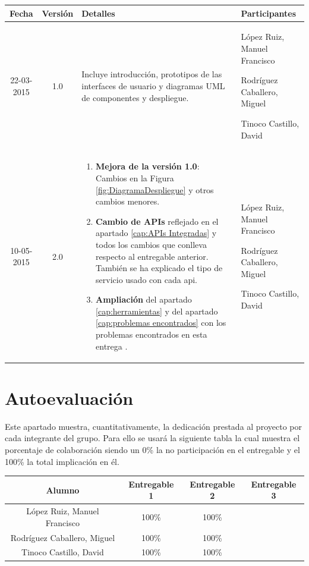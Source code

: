 \documentclass{scrartcl}
\begin{document}
\begin{tabularx}{14.9cm}{|c|c|X|X|}
	\hline \textbf{Fecha} & \textbf{Versión} & \centering \textbf{Detalles} & \textbf{Participantes} \\ 
	\hline 22-03-2015 & 1.0 & Incluye introducción, prototipos de las interfaces de usuario y diagramas UML de componentes y despliegue.  & 
	López Ruiz, Manuel Francisco
	
	Rodríguez Caballero, Miguel
	
	Tinoco Castillo, David \\	 
		\hline 10-05-2015 & 2.0 & \begin{enumerate}[\textbf{\textperiodcentered}]
		\item \textbf{Mejora de la versión 1.0}: Cambios en la Figura \ref{fig:DiagramaDespliegue} y otros cambios menores. 
		 \item \textbf{Cambio de APIs} reflejado en el apartado \ref{cap:APIs Integradas} y todos los cambios que conlleva respecto al entregable anterior. También se ha explicado el tipo de servicio usado con cada api.
		
		\item \textbf{Ampliación} del apartado \ref{cap:herramientas} y del apartado \ref{cap:problemas encontrados} con los problemas encontrados en esta entrega  . \end{enumerate}
		 & 
		López Ruiz, Manuel Francisco
		
		Rodríguez Caballero, Miguel
		
		Tinoco Castillo, David \\	 
	\hline  
	
\end{tabularx} 

\section{Autoevaluación}
Este apartado muestra, cuantitativamente, la dedicación prestada al proyecto por cada integrante del grupo. Para ello se usará la siguiente tabla la cual muestra el porcentaje de colaboración siendo un 0\% la no participación en el entregable y el 100\% la total implicación en él.
\\

\begin{tabularx}{14cm}{|c|c|c|c|}
	\hline \textbf{Alumno} & \textbf{Entregable 1} & \textbf{Entregable 2} & \textbf{Entregable 3} \\ 
	\hline 	López Ruiz, Manuel Francisco 	& 100\% & 100\%  &  \\	 
	\hline  Rodríguez Caballero, Miguel		& 100\% & 100\%  &  \\ 
	\hline  Tinoco Castillo, David			& 100\% & 100\%  & \\
	\hline 
\end{tabularx} 
\end{document}
